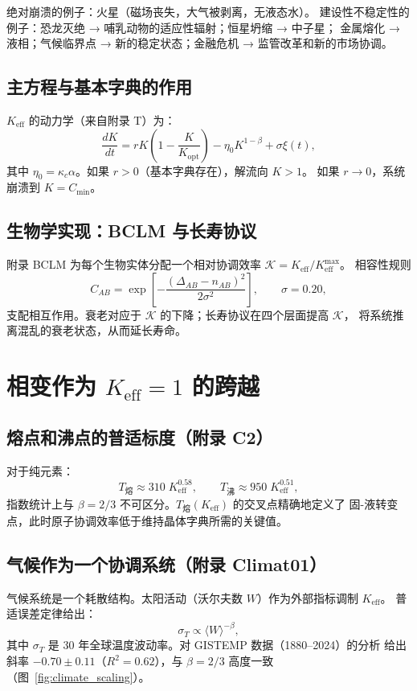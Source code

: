 \documentclass[12pt,a4paper]{article}
\newcommand{\Keff}{K_{\mathrm{eff}}}
\newcommand{\REL}{\mathcal{K}}
\begin{document}
	绝对崩溃的例子：火星（磁场丧失，大气被剥离，无液态水）。
	建设性不稳定性的例子：恐龙灭绝 → 哺乳动物的适应性辐射；恒星坍缩 → 中子星；
	金属熔化 → 液相；气候临界点 → 新的稳定状态；金融危机 → 监管改革和新的市场协调。
	
	\subsection{主方程与基本字典的作用}
	
	$\Keff$ 的动力学（来自附录 T）为：
	\begin{equation}
		\frac{dK}{dt} = r K\left(1 - \frac{K}{K_{\mathrm{opt}}}\right) - \eta_0 K^{1-\beta} + \sigma \xi(t),
		\label{eq:master}
	\end{equation}
	其中 $\eta_0 = \kappa_c \alpha$。如果 $r > 0$（基本字典存在），解流向 $K > 1$。
	如果 $r \to 0$，系统崩溃到 $K = C_{\min}$。
	
	\subsection{生物学实现：BCLM 与长寿协议}
	
	附录 BCLM 为每个生物实体分配一个相对协调效率 $\REL = \Keff/\Keff^{\max}$。
	相容性规则
	\[
	C_{AB} = \exp\!\left[-\frac{(\Delta_{AB} - n_{AB})^2}{2\sigma^2}\right],\qquad \sigma = 0.20,
	\]
	支配相互作用。衰老对应于 $\REL$ 的下降；长寿协议在四个层面提高 $\REL$，
	将系统推离混乱的衰老状态，从而延长寿命。
	
	\section{相变作为 $\Keff = 1$ 的跨越}
	
	\subsection{熔点和沸点的普适标度（附录 C2）}
	
	对于纯元素：
	\[
	T_{\text{熔}} \approx 310\;\Keff^{0.58}, \qquad
	T_{\text{沸}} \approx 950\;\Keff^{0.51},
	\]
	指数统计上与 $\beta = 2/3$ 不可区分。$T_{\text{熔}}(\Keff)$ 的交叉点精确地定义了
	固-液转变点，此时原子协调效率低于维持晶体字典所需的关键值。
	
	\subsection{气候作为一个协调系统（附录 Climat01）}
	
	气候系统是一个耗散结构。太阳活动（沃尔夫数 $W$）作为外部指标调制 $\Keff$。
	普适误差定律给出：
	\[
	\sigma_T \propto \langle W \rangle^{-\beta},
	\]
	其中 $\sigma_T$ 是 30 年全球温度波动率。对 GISTEMP 数据（1880–2024）的分析
	给出斜率 $-0.70\pm0.11$（$R^2=0.62$），与 $\beta = 2/3$ 高度一致（图~\ref{fig:climate_scaling}）。
	
\end{document}
